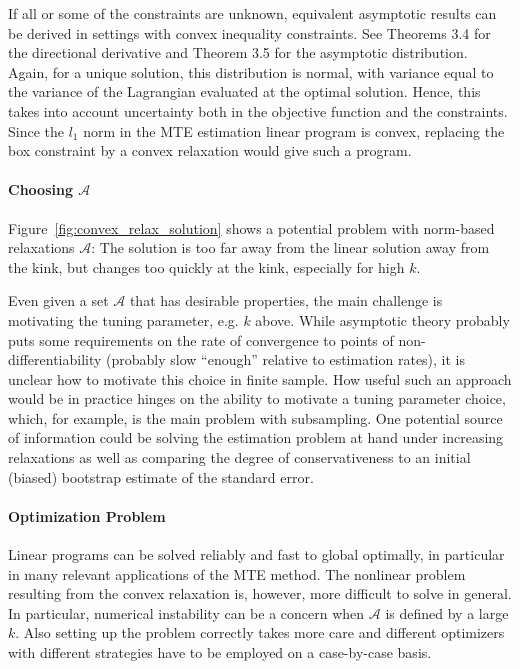 \documentclass[12pt,a4paper,english]{article} %
\numberwithin{equation}{section}
\theoremstyle{definition}
\theoremstyle{remark}
\theoremstyle{plain}
\begin{document}
If all or some of the constraints are unknown, equivalent asymptotic results can be derived in settings with convex inequality constraints.
See Theorems 3.4 for the directional derivative and Theorem 3.5 for the asymptotic distribution.
Again, for a unique solution, this distribution is normal, with variance equal to the variance of the Lagrangian evaluated at the optimal solution.
Hence, this takes into account uncertainty both in the objective function and the constraints.
Since the $l_1$ norm in the MTE estimation linear program is convex, replacing the box constraint by a convex relaxation would give such a program.

\paragraph{Choosing $\mathcal{A}$}
Figure~\ref{fig:convex_relax_solution} shows a potential problem with norm-based relaxations $\mathcal{A}$:
The solution is too far away from the linear solution away from the kink, but changes too quickly at the kink, especially for high $k$.

Even given a set $\mathcal{A}$ that has desirable properties, the main challenge is motivating the tuning parameter, e.g. $k$ above.
While asymptotic theory probably puts some requirements on the rate of convergence to points of non-differentiability (probably slow ``enough'' relative to estimation rates), it is unclear how to motivate this choice in finite sample.
How useful such an approach would be in practice hinges on the ability to motivate a tuning parameter choice, which, for example, is the main problem with subsampling.
One potential source of information could be solving the estimation problem at hand under increasing relaxations as well as comparing the degree of conservativeness to an initial (biased) bootstrap estimate of the standard error.

\paragraph{Optimization Problem}
Linear programs can be solved reliably and fast to global optimally, in particular in many relevant applications of the MTE method.
The nonlinear problem resulting from the convex relaxation is, however, more difficult to solve in general.
In particular, numerical instability can be a concern when $\mathcal{A}$ is defined by a large $k$.
Also setting up the problem correctly takes more care and different optimizers with different strategies have to be employed on a case-by-case basis.
\end{document}
